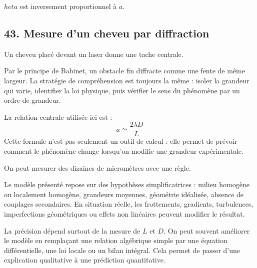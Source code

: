 \documentclass[11pt,a4paper]{article}
\begin{document}
\begin{corrigebox}[Indication]
$	heta$ est inversement proportionnel à $a$.
\end{corrigebox}


\subsection{43. Mesure d'un cheveu par diffraction}

\begin{exemplebox}
Un cheveu placé devant un laser donne une tache centrale.
\end{exemplebox}

\begin{methodebox}
Par le principe de Babinet, un obstacle fin diffracte comme une fente de même largeur.
La stratégie de compréhension est toujours la même : isoler la grandeur qui varie, identifier la loi physique, puis vérifier le sens du phénomène par un ordre de grandeur.
\end{methodebox}

\begin{theorembox}
La relation centrale utilisée ici est :
\[
a\simeq\frac{2\lambda D}{L}
\]
Cette formule n'est pas seulement un outil de calcul : elle permet de prévoir comment le phénomène change lorsqu'on modifie une grandeur expérimentale.
\end{theorembox}

\begin{odgbox}
On peut mesurer des dizaines de micromètres avec une règle.
\end{odgbox}

\begin{attentionbox}
Le modèle présenté repose sur des hypothèses simplificatrices : milieu homogène ou localement homogène, grandeurs moyennes, géométrie idéalisée, absence de couplages secondaires. En situation réelle, les frottements, gradients, turbulences, imperfections géométriques ou effets non linéaires peuvent modifier le résultat.
\end{attentionbox}

\begin{approfondissementbox}
La précision dépend surtout de la mesure de $L$ et $D$.
On peut souvent améliorer le modèle en remplaçant une relation algébrique simple par une équation différentielle, une loi locale ou un bilan intégral. Cela permet de passer d'une explication qualitative à une prédiction quantitative.
\end{approfondissementbox}
\end{document}
